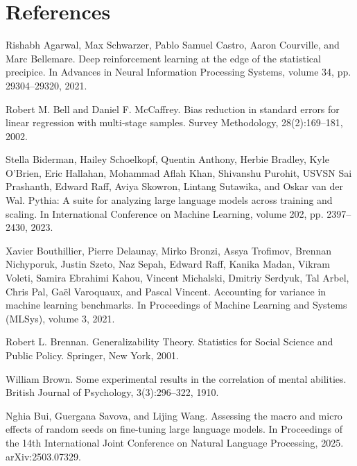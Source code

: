 \section*{References}

\noindent Rishabh Agarwal, Max Schwarzer, Pablo Samuel Castro, Aaron Courville, and Marc Bellemare. Deep reinforcement learning at the edge of the statistical precipice. In Advances in Neural Information Processing Systems, volume 34, pp. 29304--29320, 2021.\par\medskip

\noindent Robert M. Bell and Daniel F. McCaffrey. Bias reduction in standard errors for linear regression with multi-stage samples. Survey Methodology, 28(2):169--181, 2002.\par\medskip

\noindent Stella Biderman, Hailey Schoelkopf, Quentin Anthony, Herbie Bradley, Kyle O'Brien, Eric Hallahan, Mohammad Aflah Khan, Shivanshu Purohit, USVSN Sai Prashanth, Edward Raff, Aviya Skowron, Lintang Sutawika, and Oskar van der Wal. Pythia: A suite for analyzing large language models across training and scaling. In International Conference on Machine Learning, volume 202, pp. 2397--2430, 2023.\par\medskip

\noindent Xavier Bouthillier, Pierre Delaunay, Mirko Bronzi, Assya Trofimov, Brennan Nichyporuk, Justin Szeto, Naz Sepah, Edward Raff, Kanika Madan, Vikram Voleti, Samira Ebrahimi Kahou, Vincent Michalski, Dmitriy Serdyuk, Tal Arbel, Chris Pal, Ga\"{e}l Varoquaux, and Pascal Vincent. Accounting for variance in machine learning benchmarks. In Proceedings of Machine Learning and Systems (MLSys), volume 3, 2021.\par\medskip

\noindent Robert L. Brennan. Generalizability Theory. Statistics for Social Science and Public Policy. Springer, New York, 2001.\par\medskip

\noindent William Brown. Some experimental results in the correlation of mental abilities. British Journal of Psychology, 3(3):296--322, 1910.\par\medskip

\noindent Nghia Bui, Guergana Savova, and Lijing Wang. Assessing the macro and micro effects of random seeds on fine-tuning large language models. In Proceedings of the 14th International Joint Conference on Natural Language Processing, 2025. arXiv:2503.07329.\par\medskip

